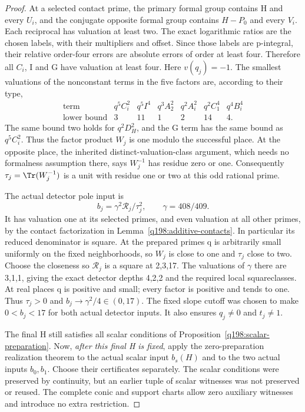 \begin{proof}
At a selected contact prime, the primary formal group contains H
and every $U_i$, and the conjugate opposite formal group contains
$H-P_0$ and every $V_i$. Each reciprocal has valuation at least two.
The exact logarithmic ratios are the chosen labels, with their
multipliers and offset. Since those labels are p-integral, their
relative order-four errors are absolute errors of order at least
four. Therefore all $C_i$, I and G have valuation at least four.
Here $v(q_j)=-1$. The smallest valuations of the nonconstant terms
in the five factors are, according to their type,
\[
 \begin{array}{c|cccccc}
 \text{term}&q^5C_i^2&q^5I^4&q^3A_2^2&q^2A_i^2
                  &q^2C_1^4&q^4B_i^4\\ \hline
 \text{lower bound}&3&11&1&2&14&4.
 \end{array}
\]
The same bound two holds for $q^2D_H^2$, and the G term has
the same bound as $q^5C_i^2$. Thus the factor product $W_j$
is one modulo the successful place. At the opposite place, the
inherited distinct-valuation-class argument, which needs no formalness
assumption there, says $W_j^{-1}$ has residue zero or one.
Consequently $\tau_j=\Tr(W_j^{-1})$ is a unit with residue one or
two at this odd rational prime.

The actual detector pole input is
\[
             b_j=\gamma^2\mathcal R_j/\tau_j^2,\qquad
                         \gamma=408/409.
\]
It has valuation one at its selected primes, and even valuation at
all other primes, by the contact factorization in
Lemma~\ref{q198:additive-contacts}. In particular its reduced
denominator is square. At the prepared primes q is arbitrarily
small uniformly on the fixed neighborhoods, so $W_j$ is close to
one and $\tau_j$ close to two. Choose the closeness so
$\mathcal R_j$ is a square at 2,3,17. The valuations of $\gamma$
there are 3,1,1, giving the exact detector depths 4,2,2 and the
required local squareclasses. At real places q is positive and
small; every factor is positive and tends to one. Thus
$\tau_j>0$ and $b_j\to\gamma^2/4\in(0,17)$.
The fixed slope cutoff was chosen to make $0<b_j<17$ for both
actual detector inputs. It also ensures $q_j\ne0$ and $t_j\ne1$.

The final H still satisfies all scalar conditions of
Proposition~\ref{q198:scalar-preparation}. Now, \emph{after this
final H is fixed}, apply the zero-preparation realization theorem
to the actual scalar input $b_s(H)$ and to the two actual inputs
$b_0,b_1$. Choose their certificates separately. The scalar
conditions were preserved by continuity, but an earlier tuple of
scalar witnesses was not preserved or reused. The complete conic
and support charts allow zero auxiliary witnesses and introduce no
extra restriction.


\end{proof}

